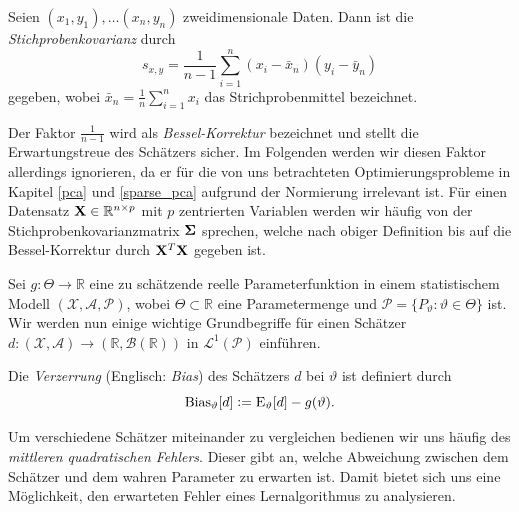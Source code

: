 \begin{defn}
Seien $(x_1, y_1), \ldots (x_n, y_n)$ zweidimensionale Daten. Dann ist die \textit{Stichprobenkovarianz} durch
$$s_{x,y} = \frac{1}{n-1} \sum_{i=1}^n (x_i - \bar{x}_n)(y_i - \bar{y}_n)$$
gegeben, wobei $\bar{x}_n = \frac{1}{n}\sum _{i=1}^{n}x_{i}$ das Strichprobenmittel bezeichnet.
\end{defn}

Der Faktor $\frac{1}{n-1}$ wird als \textit{Bessel-Korrektur} bezeichnet und stellt die Erwartungstreue des Schätzers sicher. Im Folgenden werden wir diesen Faktor allerdings ignorieren, da er für die von uns betrachteten Optimierungsprobleme in Kapitel \ref{pca} und \ref{sparse_pca} aufgrund der Normierung irrelevant ist. Für einen Datensatz $\mathbf{X} \in \mathbb{R}^{n \times p}$ mit $p$ zentrierten Variablen werden wir häufig von der Stichprobenkovarianzmatrix $\mathbf{\Sigma}$ sprechen, welche nach obiger Definition bis auf die Bessel-Korrektur durch $\mathbf{X}^T\mathbf{X}$ gegeben ist.

Sei $g\colon \Theta \to \mathbb {R}$ eine zu schätzende reelle Parameterfunktion in einem statistischem Modell $(\mathcal{X},\mathcal {A},\mathcal{P})$, wobei $\Theta \subset \mathbb{R}$ eine Parametermenge und $\mathcal{P} = \{P_{\vartheta } \colon \vartheta \in \Theta \}$ ist. Wir werden nun einige wichtige Grundbegriffe für einen Schätzer $d \colon (\mathcal{X}, \mathcal{A}) \rightarrow (\mathbb{R}, \mathcal{B}(\mathbb{R}))$ in $\mathcal{L}^1(\mathcal{P})$ einführen.

\begin{defn}
Die \textit{Verzerrung} (Englisch: \textit{Bias}) des Schätzers $d$ bei $\vartheta$ ist definiert durch
$$\operatorname {Bias} _{\vartheta }[d] \vcentcolon= \operatorname {E} _{\vartheta }[d]-g(\vartheta ).$$
\end{defn}


Um verschiedene Schätzer miteinander zu vergleichen bedienen wir uns häufig des \textit{mittleren quadratischen Fehlers}. Dieser gibt an, welche Abweichung zwischen dem Schätzer und dem wahren Parameter zu erwarten ist. Damit bietet sich uns eine Möglichkeit, den erwarteten Fehler eines Lernalgorithmus zu analysieren.

